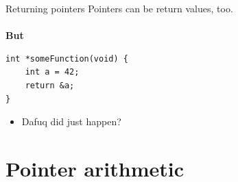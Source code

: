 
\begin{frame}[fragile]{Returning pointers}
Pointers can be return values, too.\\\ \\
\textbf{But} 
	\begin{lstlisting}[numbers=none]
int *someFunction(void) {	
	int a = 42;
	return &a;
}
\end{lstlisting}
	\begin{itemize}
		\item Dafuq did just happen?
	\end{itemize}
\end{frame}

\section{Pointer arithmetic}


